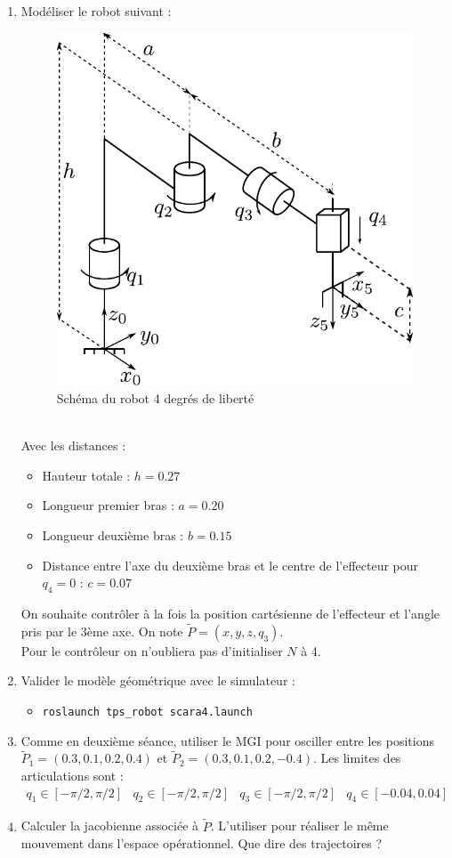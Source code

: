 \documentclass[12pt,a4paper]{article}
\begin{document}
\begin{enumerate}
\item Modéliser le robot suivant :
\begin{figure}[h]
  \centering
  \includegraphics[width=.4\linewidth]{figs/scara4}
  \caption{Schéma du robot 4 degrés de liberté}
  \label{fig:3RP}
\end{figure}\\
Avec les distances :
\begin{itemize}
\item Hauteur totale : $h=0.27$
\item Longueur premier bras : $a=0.20$
\item Longueur deuxième bras : $b = 0.15$
\item Distance entre l'axe du deuxième bras et le centre de l'effecteur pour $q_4=0$ : $c=0.07$
\end{itemize}
On souhaite contrôler à la fois la position cartésienne de l'effecteur et l'angle pris par le 3ème axe. On note $\tilde{P} = (x,y,z,q_3)$.\\
Pour le contrôleur on n'oubliera pas d'initialiser $N$ à 4.
\item Valider le modèle géométrique avec le simulateur :
\begin{itemize}
\item \texttt{roslaunch tps\_robot scara4.launch}
\end{itemize}
\item 
Comme en deuxième séance, utiliser le MGI pour osciller entre les positions $\tilde{P}_1=(0.3,0.1,0.2,0.4)$ et $\tilde{P}_2=(0.3,0.1,0.2,-0.4)$.
Les limites des articulations sont :
  \begin{equation*}
  \begin{array}{cccc}
  q_1\in[-\pi/2,\pi/2] & q_2 \in [-\pi/2,\pi/2] & q_3\in[-\pi/2,\pi/2] & q_4\in[-0.04,0.04]
  \end{array}
  \end{equation*}
\item Calculer la jacobienne associée à $\tilde{P}$. L'utiliser pour réaliser le même mouvement dans l'espace opérationnel. Que dire des trajectoires ?
\end{enumerate}
\end{document}
